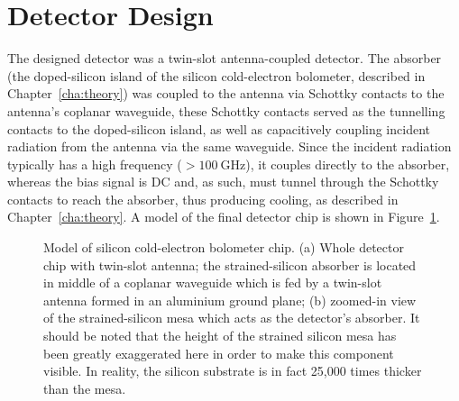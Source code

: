 \section{Detector Design}\label{sec:deviceDesign}
The designed detector was a twin-slot antenna-coupled detector. The absorber (the doped-silicon island of the silicon cold-electron bolometer, described in Chapter~\ref{cha:theory}) was coupled to the antenna via Schottky contacts to the antenna's coplanar waveguide, these Schottky contacts served as the tunnelling contacts to the doped-silicon island, as well as capacitively coupling incident radiation from the antenna via the same waveguide. Since the incident radiation typically has a high frequency ($> 100~\mathrm{GHz}$), it couples directly to the absorber, whereas the bias signal is DC and, as such, must tunnel through the Schottky contacts to reach the absorber, thus producing cooling, as described in Chapter~\ref{cha:theory}. A model of the final detector chip is shown in Figure~\ref{fig:SiCEBchip}.
\begin{figure}[tb]
\begin{center}
\caption[Model of silicon cold-electron bolometer detector chip]{Model of silicon cold-electron bolometer chip. (a) Whole detector chip with twin-slot antenna; the strained-silicon absorber is located in middle of a coplanar waveguide which is fed by a twin-slot antenna formed in an aluminium ground plane; (b) zoomed-in view of the strained-silicon mesa which acts as the detector's absorber. It should be noted that the height of the strained silicon mesa has been greatly exaggerated here in order to make this component visible. In reality, the silicon substrate is in fact 25,000 times thicker than the mesa.}
\label{fig:SiCEBchip}
\end{center}
\end{figure}
%
